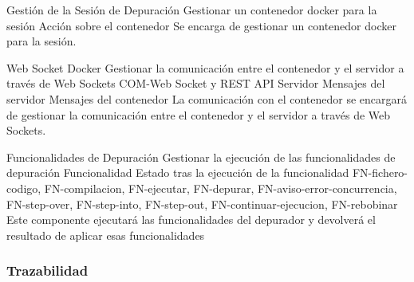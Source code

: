 \begin{component}{Gestión de la Sesión de Depuración}
{Gestionar un contenedor docker para la sesión}
{} %
{Acción sobre el contenedor} %
{\NA} %
{} %
Se encarga de gestionar un contenedor docker para la sesión. %
\end{component}


\begin{component}{Web Socket Docker}
{Gestionar la comunicación entre el contenedor y el servidor a través de Web Sockets}
{COM-Web Socket y REST API Servidor} %
{Mensajes del servidor} %
{Mensajes del contenedor} %
{} %
La comunicación con el contenedor se encargará de gestionar la comunicación entre el contenedor y el servidor a través de Web Sockets. %
\end{component}

\begin{component}{Funcionalidades de Depuración}
{Gestionar la ejecución de las funcionalidades de depuración}
{} %
{Funcionalidad} %
{Estado tras la ejecución de la funcionalidad} %
{FN-fichero-codigo, FN-compilacion, FN-ejecutar, FN-depurar, FN-aviso-error-concurrencia, FN-step-over, FN-step-into, FN-step-out, FN-continuar-ejecucion, FN-rebobinar} %
Este componente ejecutará las funcionalidades del depurador y devolverá el resultado de aplicar esas funcionalidades %
\end{component}

\FloatBarrier

\subsubsection{Trazabilidad} {\label{subsubsec:trazabilidad-comp}}

\traceabilityCompFN

